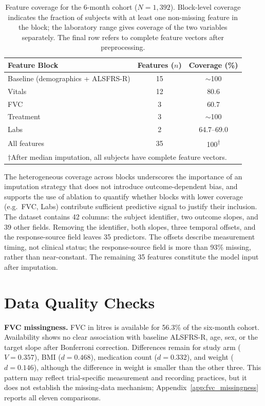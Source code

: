 \begin{table}[ht]
\centering
\caption[Feature coverage, 6-month cohort]{Feature coverage for the 6-month cohort ($N\!=\!1{,}392$). Block-level coverage indicates the fraction of subjects with at least one non-missing feature in the block; the laboratory range gives coverage of the two variables separately. The final row refers to complete feature vectors after preprocessing.}
\label{tab:feature_coverage}
\small
\begin{tabular}{lcc}
\toprule
Feature Block & Features ($n$) & Coverage (\%) \\
\midrule
Baseline (demographics + ALSFRS-R) & 15 & $\sim$100 \\
Vitals & 12 & 80.6 \\
FVC & 3 & 60.7 \\
Treatment & 3 & $\sim$100 \\
Labs & 2 & 64.7--69.0 \\
\midrule
All features & 35 & 100\textsuperscript{$\dagger$} \\
\bottomrule
\multicolumn{3}{l}{\footnotesize $\dagger$After median imputation, all subjects have complete feature vectors.}
\end{tabular}
\end{table}
\break
The heterogeneous coverage across blocks underscores the importance of an imputation strategy that does not introduce outcome-dependent bias, and supports the use of ablation to quantify whether blocks with lower coverage (e.g.\ FVC, Labs) contribute sufficient predictive signal to justify their inclusion.
The dataset contains 42 columns: the subject identifier, two outcome slopes, and 39 other fields. Removing the identifier, both slopes, three temporal offsets, and the response-source field leaves 35 predictors. The offsets describe measurement timing, not clinical status; the response-source field is more than 93\% missing, rather than near-constant.
The remaining 35 features constitute the model input after imputation.


\section{Data Quality Checks}
\label{sec:results_fvc_missingness}

\noindent\textbf{FVC missingness.}
FVC in litres is available for 56.3\% of the six-month cohort. Availability shows no clear association with baseline \gls{ALSFRS-R}, age, sex, or the target slope after Bonferroni correction. Differences remain for study arm ($V=0.357$), \gls{BMI} ($d=0.468$), medication count ($d=0.332$), and weight ($d=0.146$), although the difference in weight is smaller than the other three. This pattern may reflect trial-specific measurement and recording practices, but it does not establish the missing-data mechanism; Appendix~\ref{app:fvc_missingness} reports all eleven comparisons.

